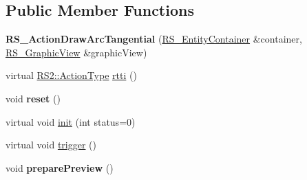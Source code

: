 \subsection*{Public Member Functions}
\begin{DoxyCompactItemize}
\item 
\hypertarget{classRS__ActionDrawArcTangential_a0aee3878e79f2ec6df8a167d2aaadb5f}{{\bfseries R\-S\-\_\-\-Action\-Draw\-Arc\-Tangential} (\hyperlink{classRS__EntityContainer}{R\-S\-\_\-\-Entity\-Container} \&container, \hyperlink{classRS__GraphicView}{R\-S\-\_\-\-Graphic\-View} \&graphic\-View)}\label{classRS__ActionDrawArcTangential_a0aee3878e79f2ec6df8a167d2aaadb5f}

\item 
virtual \hyperlink{classRS2_afe3523e0bc41fd637b892321cfc4b9d7}{R\-S2\-::\-Action\-Type} \hyperlink{classRS__ActionDrawArcTangential_a33abbe02d1cf9eca6ca0e2c65375ab49}{rtti} ()
\item 
\hypertarget{classRS__ActionDrawArcTangential_a38fc6ba73e20d050943cdca731fd6b14}{void {\bfseries reset} ()}\label{classRS__ActionDrawArcTangential_a38fc6ba73e20d050943cdca731fd6b14}

\item 
virtual void \hyperlink{classRS__ActionDrawArcTangential_a0b7f38017d23a1b5134c83a1a6244355}{init} (int status=0)
\item 
virtual void \hyperlink{classRS__ActionDrawArcTangential_a0be4ced6287e229c8a13dae282a288aa}{trigger} ()
\item 
\hypertarget{classRS__ActionDrawArcTangential_a0ccee1b7dd6ac5d816aab326c0f81609}{void {\bfseries prepare\-Preview} ()}\label{classRS__ActionDrawArcTangential_a0ccee1b7dd6ac5d816aab326c0f81609}


\end{DoxyCompactItemize}
